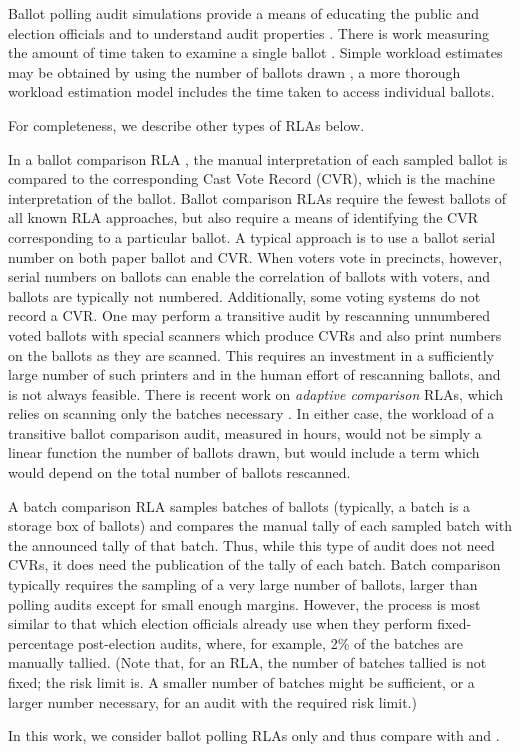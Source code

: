 Ballot polling audit simulations provide a means of educating the public and election officials \cite{dice} and to understand audit properties \cite{mclaughlin_thesis,simulations_house, blom_IRV, DBLP:conf/evoteid/HuangRSTV20}. There is work measuring the amount of time taken to examine a single ballot \cite{RI-report}. 
Simple workload estimates may be obtained by using the number of ballots drawn \cite{bernoulli-ballot-polling}, a more thorough workload estimation model includes the time taken to access individual ballots\cite{bernhard-diss}. 

For completeness, we describe other types of RLAs below.  
\begin{description}
\item In a ballot comparison RLA \cite{RLA}, the manual interpretation of each sampled ballot is compared to the corresponding Cast Vote Record (CVR), which is the machine interpretation of the ballot. Ballot comparison RLAs require the fewest ballots of all known RLA approaches, but also require a means of identifying the CVR corresponding to a particular ballot. A typical approach is to use a ballot serial number on both paper ballot and CVR. When voters vote in precincts, however, serial numbers on ballots can enable the correlation of ballots with voters, and ballots are typically not numbered. Additionally, some voting systems do not record a CVR. One may perform a transitive audit by rescanning unnumbered voted ballots with special scanners which produce CVRs and also print numbers on the ballots as they are scanned. This requires an investment in a sufficiently large number of such printers and in the human effort of rescanning ballots, and is not always feasible. There is recent work on {\em adaptive comparison} RLAs, which relies on scanning only the batches necessary \cite{adaptive-comparison}. In either case, the workload of a transitive ballot comparison audit, measured in hours, would not be simply a linear function the number of ballots drawn, but would include a term which would depend on the total number of ballots rescanned. 
\item A batch comparison RLA \cite{RI-report} samples batches of ballots (typically, a batch is a storage box of ballots) and compares the manual tally of each sampled batch with the announced tally of that batch. Thus, while this type of audit does not need CVRs, it does need the publication of the tally of each batch. Batch comparison typically requires the sampling of a very large number of ballots, larger than polling audits except for small enough margins. However, the process is most similar to that which election officials already use when they perform fixed-percentage post-election audits, where, for example, 2\% of the batches are manually tallied. (Note that, for an RLA, the number of batches tallied is not fixed; the risk limit is. A smaller number of batches might be sufficient, or a larger number necessary, for an audit with the required risk limit.)
\end{description}

In this work, we consider ballot polling RLAs only and thus compare \Providence with \BRAVO and \Minerva.
